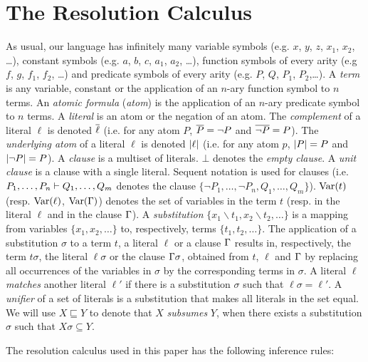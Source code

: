 \section{The Resolution Calculus}
\label{sec:res}

As usual, our language has infinitely many variable symbols (e.g. $x$, $y$, $z$, $x_1$, $x_2$, \ldots), constant symbols (e.g. $a$, $b$, $c$, $a_1$, $a_2$, \ldots), function symbols of every arity (e.g $f$, $g$, $f_1$, $f_2$, \ldots) and predicate symbols of every arity (e.g. $P$, $Q$, $P_1$, $P_2$,\ldots). A \emph{term} is any variable, constant or the application of an $n$-ary function symbol to $n$ terms.
An \emph{atomic formula} (\emph{atom}) is the application of an $n$-ary predicate symbol to $n$ terms. A \emph{literal} is an atom or the negation of an atom. The
\emph{complement} of a literal $\ell$ is denoted $\overline{\ell}$ (i.e. for any atom $P$,
$\overline{P} = \neg P$ and $\overline{\neg P} = P$). The \emph{underlying atom} of a literal $\ell$ is denoted $\lvert\ell\rvert$ (i.e. for any atom $p$, $\lvert P\rvert = P$ and $\lvert\neg P\rvert = P$). A
\emph{clause} is a multiset of literals. $\bot$ denotes the \emph{empty clause}. A \emph{unit clause} is a clause with a single literal. Sequent notation is used for clauses (i.e. $P_1,\ldots,P_n \vdash Q_1,\ldots, Q_m$ denotes the clause $\{ \neg P_1,\ldots, \neg P_n, Q_1, \ldots, Q_m \}$).
$\mathrm{Var}(t)$ (resp. $\mathrm{Var}(\ell)$, $\mathrm{Var}(\Gamma)$) denotes the set of variables in the term $t$ (resp. in the literal $\ell$ and in the clause $\Gamma$).
A \emph{substitution} $\{ x_1\backslash t_1, x_2 \backslash t_2, \ldots \}$ is a mapping from variables $\{ x_1, x_2, \ldots \}$ to, respectively, terms $\{t_1, t_2, \ldots \}$. The application of a substitution $\sigma$ to a term $t$, a literal $\ell$ or a clause $\Gamma$ results in, respectively, the term $t \sigma$, the literal $\ell \sigma$ or the clause $\Gamma \sigma$, obtained from $t$, $\ell$ and $\Gamma$ by replacing all occurrences of the variables in $\sigma$ by the corresponding terms in $\sigma$. A literal $\ell$ \emph{matches} another literal $\ell'$ if there is a substitution $\sigma$ such that $\ell\sigma=\ell'$. A \emph{unifier} of a set of literals is a substitution that makes all literals in the set equal. We will use $X \sqsubseteq Y$ to denote that $X$ \emph{subsumes} $Y$, when there exists a substitution $\sigma$ such that $X\sigma \subseteq Y$.

The resolution calculus used in this paper has the following inference rules: 

